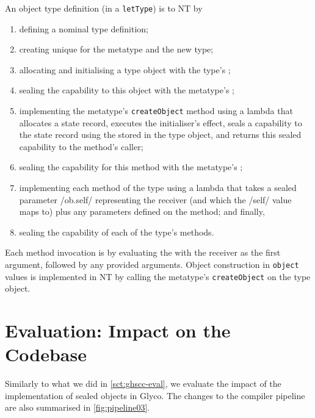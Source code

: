 \documentclass[main.tex]{subfiles}
\begin{document}
An object type definition (in a \texttt{letType}) is \lowered{} to NT by
\begin{enumerate}[nosep]
	
	\item defining a nominal type definition;
	
	\item creating unique  for the metatype and the new type;
	
	\item allocating and initialising a type object with the type's ;
	\item sealing the capability to this object with the metatype's ;
	
	\item implementing the metatype's \texttt{createObject} method using a lambda that allocates a state record, executes the initialiser's effect, seals a capability to the state record using the  stored in the type object, and returns this sealed capability to the method's caller;
	\item sealing the capability for this method with the metatype's ;
	
	\item implementing each method of the type using a lambda that takes a sealed parameter \iil/ob.self/ representing the receiver (and which the \iil/self/ value maps to) plus any parameters defined on the method; and finally,
	\item sealing the capability of each of the type's methods.
	
\end{enumerate}

Each method invocation is \lowered{} by evaluating the  with the receiver as the first argument, followed by any provided arguments. Object construction in \texttt{object} values is implemented in NT by calling the metatype's \texttt{createObject}  on the type object.

\section{Evaluation: Impact on the Codebase} \label{sct:obj-eval}
Similarly to what we did in \cref{sct:ghscc-eval}, we evaluate the impact of the implementation of sealed objects in Glyco. The changes to the compiler pipeline are also summarised in \cref{fig:pipeline03}.
\end{document}
